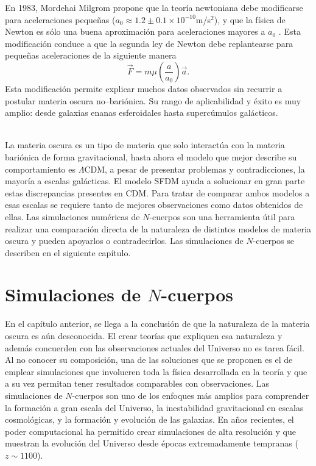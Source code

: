 \documentclass[a4paper,openright,10pt, oneside, final]{book}
\begin{document}
En 1983, Mordehai Milgrom propone que la teoría newtoniana debe modificarse para aceleraciones pequeñas ($a_{0} \approx 1.2 \pm 0.1 \times 10^{-10}$m/s$^{2}$), y que la física de Newton es sólo una buena aproximación para aceleraciones mayores a $a_{0}$ \cite{1.3.8}. Esta modificación conduce a que la segunda ley de Newton debe replantearse para pequeñas aceleraciones de la siguiente manera 
\begin{equation}
\vec{F} = m \mu (\frac{a}{a_{0}})\vec{a}.\label{eqn 1.79}
\end{equation}
Esta modificación permite explicar muchos datos observados sin recurrir a postular materia oscura no--bariónica. Su rango de aplicabilidad y éxito es muy amplio: desde galaxias enanas esferoidales hasta supercúmulos galácticos.\\\

La materia oscura es un tipo de materia que solo interactúa con la materia bariónica de forma gravitacional, hasta ahora el modelo que mejor describe su comportamiento es $\Lambda$CDM, a pesar de presentar problemas y contradicciones, la mayoría a escalas galácticas. El modelo SFDM ayuda a solucionar en gran parte estas discrepancias presentes en CDM. Para tratar de comparar ambos modelos a esas escalas se requiere tanto de mejores observaciones como datos obtenidos de ellas. Las simulaciones numéricas de $N$-cuerpos son una herramienta útil para realizar una comparación directa de la naturaleza de distintos modelos de materia oscura y pueden apoyarlos o contradecirlos. Las simulaciones de $N$-cuerpos se describen en el siguiente capítulo.




\chapter{Simulaciones de $N$-cuerpos}\label{cap.nudo}
En el capítulo anterior, se llega a la conclusión de que la naturaleza de la materia oscura es aún desconocida. El crear teorías que expliquen esa naturaleza y además concuerden con las observaciones actuales del Universo no es tarea fácil. Al no conocer su composición, una de las soluciones que se proponen es el de emplear simulaciones que involucren toda la física desarrollada en la teoría y que a su vez permitan tener resultados comparables con observaciones. Las simulaciones de $N$-cuerpos son uno de los enfoques más amplios para comprender la formación a gran escala del Universo, la inestabilidad gravitacional en escalas cosmológicas, y la formación y evolución de las galaxias. En años recientes, el poder computacional ha permitido crear simulaciones de alta resolución y que muestran la evolución del Universo desde épocas extremadamente tempranas ($z \sim 1100$).
\end{document}
